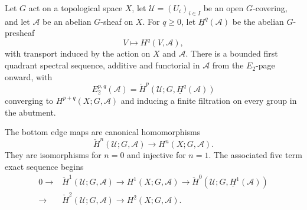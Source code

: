\begin{lemma}
\label{lemma-equivariant-cech-spectral-sequence}
\begin{reference}
\cite[Chapter V, \S 5.5, Theorem 5.5.3, pp. 208--209]{Tohoku}
\end{reference}
Let $G$ act on a topological space $X$, let
$\mathcal{U}=(U_i)_{i\in I}$ be an open $G$-covering, and let
$\mathcal{A}$ be an abelian $G$-sheaf on $X$. For $q\geq 0$, let
$\underline H^q(\mathcal{A})$ be the abelian $G$-presheaf
$$
V\longmapsto H^q(V,\mathcal{A}),
$$
with transport induced by the action on $X$ and $\mathcal{A}$. There is
a bounded first quadrant spectral sequence, additive and functorial in
$\mathcal{A}$ from the $E_2$-page onward, with
\begin{equation}
\label{equation-equivariant-cech-spectral-sequence}
E_2^{p,q}(\mathcal{A})
=\check H^p(\mathcal{U};G,\underline H^q(\mathcal{A}))
\end{equation}
converging to $H^{p+q}(X;G,\mathcal{A})$ and inducing a finite filtration
on every group in the abutment.

The bottom edge maps are canonical homomorphisms
\begin{equation}
\label{equation-equivariant-cech-edge}
\check H^n(\mathcal{U};G,\mathcal{A})
\longrightarrow H^n(X;G,\mathcal{A}).
\end{equation}
They are isomorphisms for $n=0$ and injective for $n=1$.
The associated five term exact sequence begins
$$
\begin{aligned}
0 \longrightarrow
&\check H^1(\mathcal{U};G,\mathcal{A})
\longrightarrow H^1(X;G,\mathcal{A})
\longrightarrow
\check H^0(\mathcal{U};G,\underline H^1(\mathcal{A})) \\
\longrightarrow
&\check H^2(\mathcal{U};G,\mathcal{A})
\longrightarrow H^2(X;G,\mathcal{A}).
\end{aligned}
$$
\end{lemma}

